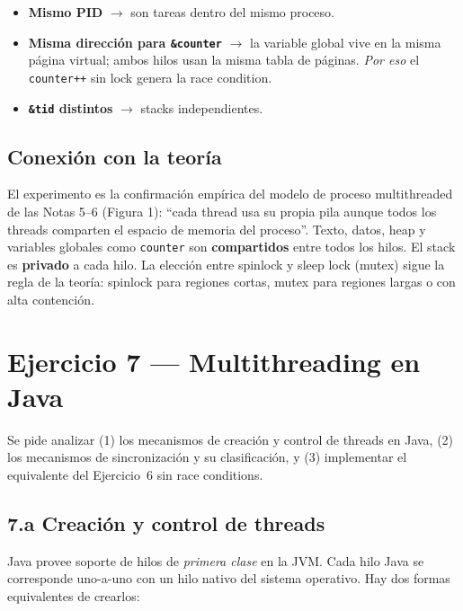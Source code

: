 \documentclass[11pt,a4paper]{article}
\begin{document}
\begin{itemize}[leftmargin=*]
    \item \textbf{Mismo PID} $\rightarrow$ son tareas dentro del mismo
        proceso.
    \item \textbf{Misma dirección para \texttt{\&counter}} $\rightarrow$
        la variable global vive en la misma página virtual; ambos hilos
        usan la misma tabla de páginas. \emph{Por eso} el
        \texttt{counter++} sin lock genera la race condition.
    \item \textbf{\texttt{\&tid} distintos} $\rightarrow$ stacks
        independientes.
\end{itemize}

\subsection*{Conexión con la teoría}

El experimento es la confirmación empírica del modelo de proceso
multithreaded de las Notas 5--6 (Figura 1):
``cada thread usa su propia pila aunque todos los threads comparten el
espacio de memoria del proceso''. Texto, datos, heap y variables
globales como \texttt{counter} son \textbf{compartidos} entre todos los
hilos. El stack es \textbf{privado} a cada hilo. La elección entre
spinlock y sleep lock (mutex) sigue la regla de la teoría: spinlock
para regiones cortas, mutex para regiones largas o con alta contención.

\section{Ejercicio 7 --- Multithreading en Java}

Se pide analizar (1) los mecanismos de creación y control de threads en
Java, (2) los mecanismos de sincronización y su clasificación, y (3)
implementar el equivalente del Ejercicio~6 sin race conditions.

\subsection*{7.a Creación y control de threads}

Java provee soporte de hilos de \emph{primera clase} en la JVM. Cada
hilo Java se corresponde uno-a-uno con un hilo nativo del sistema
operativo. Hay dos formas equivalentes de crearlos:
\end{document}

